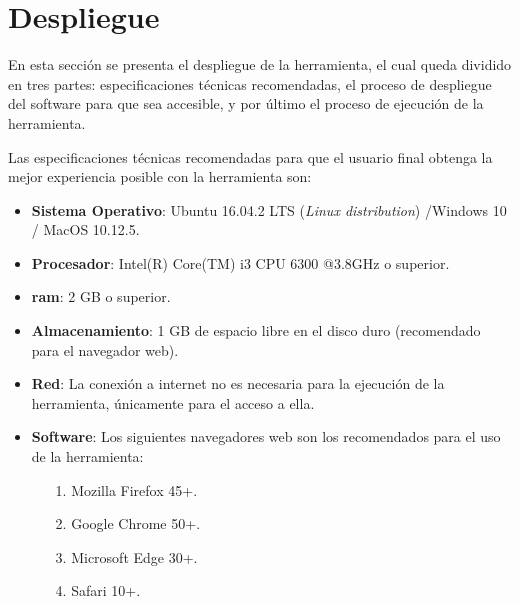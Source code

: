 \section{Despliegue}
\label{sec:deployment}

En esta sección se presenta el despliegue de la herramienta, el cual queda dividido en tres partes: especificaciones técnicas recomendadas, el proceso de despliegue del software para que sea accesible, y por último el proceso de ejecución de la herramienta.

Las especificaciones técnicas recomendadas para que el usuario final obtenga la mejor experiencia posible con la herramienta son:

\begin{itemize}

\item \textbf{Sistema Operativo}: Ubuntu 16.04.2 LTS (\emph{Linux distribution}) /Windows 10 / MacOS 10.12.5.

\item \textbf{Procesador}: Intel(R) Core(TM) i3 CPU 6300 @3.8GHz o superior.

\item \textbf{\gls{ram}}: 2 GB o superior.

\item \textbf{Almacenamiento}: 1 GB de espacio libre en el disco duro (recomendado para el navegador web).

\item \textbf{Red}: La conexión a internet no es necesaria para la ejecución de la herramienta, únicamente para el acceso a ella.

\item \textbf{Software}: Los siguientes navegadores web son los recomendados para el uso de la herramienta:

	\begin{itemize}

	\item[1.] Mozilla Firefox 45+.
	
	\item[2.] Google Chrome 50+.
	
	\item[3.] Microsoft Edge 30+.
	
	\item[4.] Safari 10+.

	\end{itemize}

\end{itemize}

